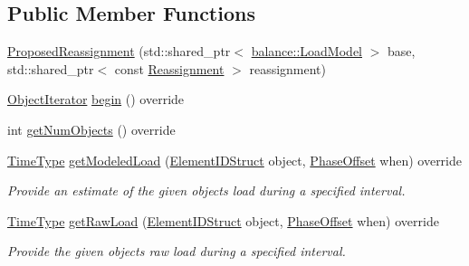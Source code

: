 \subsection*{Public Member Functions}
\begin{DoxyCompactItemize}
\item 
\hyperlink{structvt_1_1vrt_1_1collection_1_1balance_1_1_proposed_reassignment_a8c678464bec1fa46e24c69be66a45220}{Proposed\+Reassignment} (std\+::shared\+\_\+ptr$<$ \hyperlink{structvt_1_1vrt_1_1collection_1_1balance_1_1_load_model}{balance\+::\+Load\+Model} $>$ base, std\+::shared\+\_\+ptr$<$ const \hyperlink{structvt_1_1vrt_1_1collection_1_1balance_1_1_reassignment}{Reassignment} $>$ reassignment)
\item 
\hyperlink{structvt_1_1vrt_1_1collection_1_1balance_1_1_object_iterator}{Object\+Iterator} \hyperlink{structvt_1_1vrt_1_1collection_1_1balance_1_1_proposed_reassignment_aef7e98817093a99fbda1eaae7cb29f79}{begin} () override
\item 
int \hyperlink{structvt_1_1vrt_1_1collection_1_1balance_1_1_proposed_reassignment_ad265d4881094bb11cb538e7340bc8a49}{get\+Num\+Objects} () override
\item 
\hyperlink{namespacevt_a876a9d0cd5a952859c72de8a46881442}{Time\+Type} \hyperlink{structvt_1_1vrt_1_1collection_1_1balance_1_1_proposed_reassignment_a4ecd2fb3f35cc78f884682a00841d952}{get\+Modeled\+Load} (\hyperlink{namespacevt_1_1vrt_1_1collection_1_1balance_a9f5b53fafb270212279a4757d2c4cd28}{Element\+I\+D\+Struct} object, \hyperlink{structvt_1_1vrt_1_1collection_1_1balance_1_1_phase_offset}{Phase\+Offset} when) override
\begin{DoxyCompactList}\small\item\em Provide an estimate of the given object\textquotesingle{}s load during a specified interval. \end{DoxyCompactList}\item 
\hyperlink{namespacevt_a876a9d0cd5a952859c72de8a46881442}{Time\+Type} \hyperlink{structvt_1_1vrt_1_1collection_1_1balance_1_1_proposed_reassignment_ad44c997bd26cc8781ee0ecddfa8e0dfc}{get\+Raw\+Load} (\hyperlink{namespacevt_1_1vrt_1_1collection_1_1balance_a9f5b53fafb270212279a4757d2c4cd28}{Element\+I\+D\+Struct} object, \hyperlink{structvt_1_1vrt_1_1collection_1_1balance_1_1_phase_offset}{Phase\+Offset} when) override
\begin{DoxyCompactList}\small\item\em Provide the given object\textquotesingle{}s raw load during a specified interval. \end{DoxyCompactList}\end{DoxyCompactItemize}
